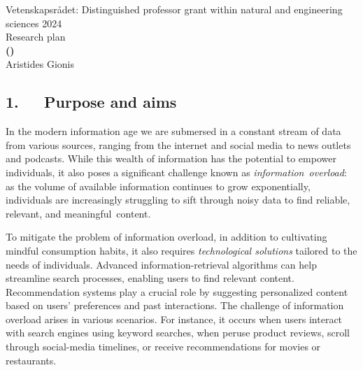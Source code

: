 \documentclass[a4paper,11pt]{article}
\begin{document}
\begin{center} 
{\large Vetenskapsrådet: Distinguished professor grant within natural %
and engineering sciences 2024} \vspace{2.5mm}\\
{\Large Research plan} \vspace{2mm}\\
{\LARGE\bf {\proposaltitle} {\sc (}{\acronymtitle}{\sc )}}  \vspace{3mm} \\
{\Large Aristides Gionis}  \\
\end{center}

\subsection*{1.~~~Purpose and aims}

In the modern information age we are submersed in a constant stream of data from various sources, 
ranging from the internet and social media to news outlets and podcasts. 
While this wealth of information has the potential to empower individuals, 
it also poses a significant challenge known as \emph{information~overload}:
as the volume of available information continues to grow exponentially, 
individuals are increasingly struggling to sift through noisy data
to find reliable, relevant, and meaningful~content.

\iffalse
This overload can lead to decision paralysis, reduced productivity, and cognitive overload, ultimately hindering our ability to make informed decisions and engage critically with the world around us. Addressing the problem of information overload requires not only technological solutions such as improved search algorithms and filtering mechanisms but also a concerted effort to cultivate digital literacy skills and promote mindful consumption habits among individuals.
\fi 

To mitigate the problem of information overload, 
in addition to cultivating %
mindful consumption habits, 
it also requires \emph{technological solutions} tailored to the needs of individuals. 
Advanced information-retrieval algorithms can help streamline search processes, 
enabling users to find relevant content. 
Recommendation systems play a crucial role by suggesting personalized content 
based on users' preferences and past interactions. 
The challenge of information overload arises in various scenarios. 
For instance, it occurs when users interact with search engines using keyword searches, 
when peruse product reviews, 
scroll through social-media timelines, or 
receive recommendations for movies or restaurants.
\end{document}
